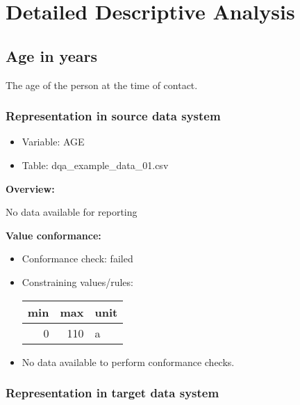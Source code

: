 \documentclass[
]{article}
\providecommand{\tightlist}{%
  \setlength{\itemsep}{0pt}\setlength{\parskip}{0pt}}
\begin{document}
\newpage

\hypertarget{detailed-descriptive-analysis}{%
\section{Detailed Descriptive
Analysis}\label{detailed-descriptive-analysis}}

\hypertarget{age-in-years}{%
\subsection{Age in years}\label{age-in-years}}

The age of the person at the time of contact.

\hypertarget{representation-in-source-data-system}{%
\subsubsection{\texorpdfstring{Representation in \textbf{source} data
system}{Representation in source data system}}\label{representation-in-source-data-system}}

\begin{itemize}
\tightlist
\item
  Variable: AGE
\item
  Table: dqa\_example\_data\_01.csv
\end{itemize}

\textbf{Overview:}

No data available for reporting

\textbf{Value conformance:}

\begin{itemize}
\tightlist
\item
  Conformance check: failed
\item
  Constraining values/rules:

  \begin{table}[H]
  \centering
  \begin{tabular}{r|r|l}
  \hline
  \textbf{min} & \textbf{max} & \textbf{unit}\\
  \hline
  0 & 110 & a\\
  \hline
  \end{tabular}
  \end{table}
\item
  No data available to perform conformance checks.
\end{itemize}

\newpage

\hypertarget{representation-in-target-data-system}{%
\subsubsection{\texorpdfstring{Representation in \textbf{target} data
system}{Representation in target data system}}\label{representation-in-target-data-system}}
\end{document}
